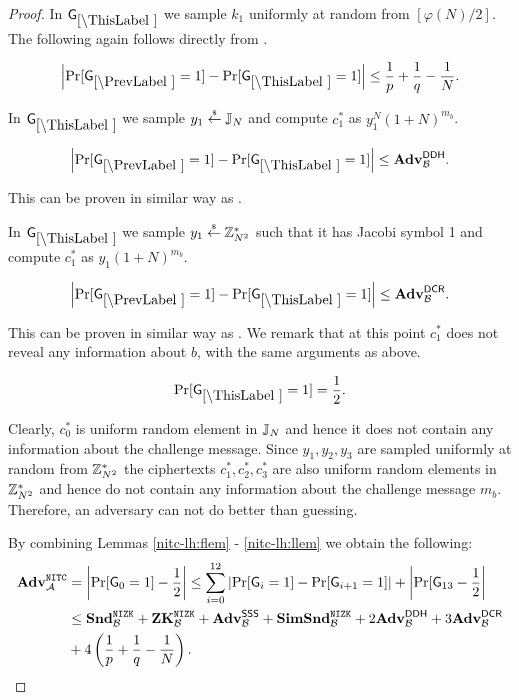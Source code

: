 \begin{proof}
In $\games_\thisgame$ we sample $k_1$ uniformly at random from $[\varphi(N)/2]$. The following again follows directly from .


\begin{lemma}
\[
\left|\Pr[\games_\prevgame = 1] - \Pr[\games_\thisgame = 1]\right| \leq \frac{1}{p}+\frac{1}{q}-\frac{1}{N}.
\]
\end{lemma}


In $\games_\thisgame$ we sample $y_1 \stackrel{{\scriptscriptstyle\$}}{\leftarrow} \mathbb{J}_N$ and compute $c_1^*$ as  $y_1^{N} (1+N)^{m_b}$. 

\begin{lemma}
\[
\left|\Pr[\games_\prevgame = 1] - \Pr[\games_\thisgame = 1]\right| \leq \advtg_\advB^\ddh.
\]
\end{lemma}
This can be proven in similar way as .

In $\games_\thisgame$ we sample $y_1 \stackrel{{\scriptscriptstyle\$}}{\leftarrow} \mathbb{Z}_{N^2}^*$ such that it has Jacobi symbol 1 and compute $c_1^*$ as $y_1(1+N)^{m_b}$. 

\begin{lemma}
\[
\left|\Pr[\games_\prevgame = 1] - \Pr[\games_\thisgame = 1]\right| \leq \advtg_\advB^\dcr.
\]
\end{lemma}
This can be proven in similar way as . We remark that at this point $c_1^*$ does not reveal any information about $b$, with the same arguments as above.

\begin{lemma}\label{nitc-lh:llem}
\[
\Pr[\games_\thisgame = 1] = \half.
\]
\end{lemma}

Clearly, $c_0^*$ is uniform random element in $\mathbb{J}_N$ and hence it does not contain any information about the challenge message. Since $y_1, y_2, y_3$ are sampled uniformly at random from $\mathbb{Z}_{N^2}^*$ the ciphertexts $c_1^*, c_2^*, c_3^*$ are also uniform random elements in $\mathbb{Z}_{N^2}^*$ and hence do not contain any information about the challenge message $m_b$. Therefore, an adversary can not do better than guessing.

By combining Lemmas \ref{nitc-lh:flem} - \ref{nitc-lh:llem} we obtain the following:
\begin{align*}
\mathbf{Adv}^{\mathtt{NITC}}_{\mathcal{A}} &= \left| \Pr[\mathsf{G}_0 = 1] - \frac{1}{2} \right| \leq \sum_{i=0}^{12} \left|\Pr[\mathsf{G}_i = 1] - \Pr[\mathsf{G}_{i+1} = 1] \right| + \left|\Pr[\mathsf{G}_{13}- \frac{1}{2}\right| \\
 &\leq  \mathbf{Snd}^{\mathtt{NIZK}}_{\mathcal{B}} + \mathbf{ZK}^{\mathtt{NIZK}}_{\mathcal{B}} + \mathbf{Adv}^{\mathsf{SSS}}_{\mathcal{B}} + \mathbf{SimSnd}^{\mathtt{NIZK}}_{\mathcal{B}} + 2 \mathbf{Adv}^{\mathsf{DDH}}_{\mathcal{B}} + 3 \mathbf{Adv}^{\mathsf{DCR}}_{\mathcal{B}} \\ &+ 4 \left( \frac{1}{p}+\frac{1}{q}-\frac{1}{N} \right).
\end{align*}
\end{proof}

